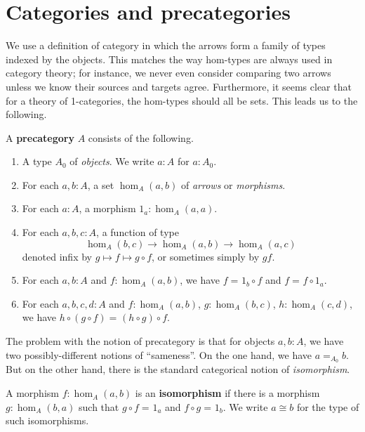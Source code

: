 \documentclass{mscs}
\newcommand{\id}[3][]{\ensuremath{#2 =_{#1} #3}\xspace}
\numberwithin{equation}{section}
\begin{document}
\section{Categories and precategories}
\label{sec:cats}

We use a definition of category in which the arrows form a family of types indexed by the objects.
This matches the way hom-types are always used in category theory; for instance, we never even consider comparing two arrows unless we know their sources and targets agree.
Furthermore, it seems clear that for a theory of 1-categories, the hom-types should all be sets.
This leads us to the following.

\begin{defn}\label{ct:precategory}
  A \textbf{precategory} $A$ consists of the following.
  \begin{enumerate}
  \item A type $A_0$ of \emph{objects}.  We write $a:A$ for $a:A_0$.
  \item For each $a,b:A$, a set $\hom_A(a,b)$ of \emph{arrows} or \emph{morphisms}.
  \item For each $a:A$, a morphism $1_a:\hom_A(a,a)$.
  \item For each $a,b,c:A$, a function of type
    \[  \hom_A(b,c) \to \hom_A(a,b) \to \hom_A(a,c) \]
    denoted infix by $g\mapsto f\mapsto g\circ f$, or sometimes simply by $gf$.
  \item For each $a,b:A$ and $f:\hom_A(a,b)$, we have $\id f {1_b\circ f}$ and $\id f {f\circ 1_a}$.
  \item For each $a,b,c,d:A$ and $f:\hom_A(a,b)$, $g:\hom_A(b,c)$, $h:\hom_A(c,d)$, we have $\id {h\circ (g\circ f)}{(h\circ g)\circ f}$.
  \end{enumerate}
\end{defn}

The problem with the notion of precategory is that for objects $a,b:A$, we have two possibly-different notions of ``sameness''.
On the one hand, we have $\id[A_0]{a}{b}$.
But on the other hand, there is the standard categorical notion of \emph{isomorphism}.

\begin{defn}\label{ct:isomorphism}
  A morphism $f:\hom_A(a,b)$ is an \textbf{isomorphism} if there is a morphism $g:\hom_A(b,a)$ such that $\id{g\circ f}{1_a}$ and $\id{f\circ g}{1_b}$.
  We write $a\cong b$ for the type of such isomorphisms.
\end{defn}
\end{document}
